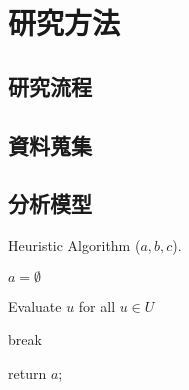 
\chapter{研究方法}

\section{研究流程}

\section{資料蒐集}

\section{分析模型}

\begin{algorithm}
    \caption{ Heuristic Algorithm ($a,b,c$).}
    \label{alg:main}
    \begin{algorithmic}[1]

        \State $a = \emptyset$

        \State Evaluate $u$ for all $u \in U$



        \State break

        \EndIf

        \EndWhile
        \State return $a$;

    \end{algorithmic}
\end{algorithm}